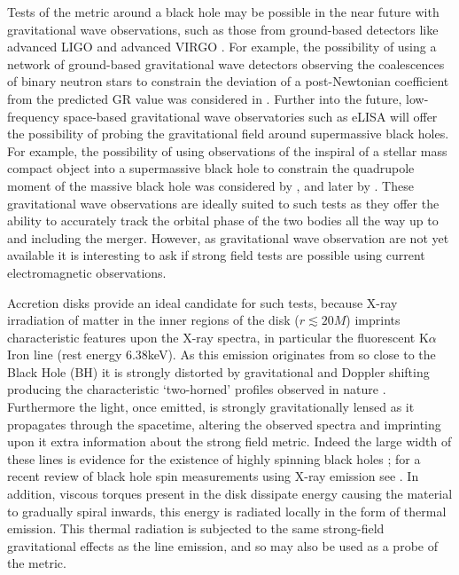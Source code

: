 Tests of the metric around a black hole may be possible in the near future with gravitational wave observations, such as those from ground-based detectors like advanced LIGO and advanced VIRGO \citep{2010CQGra..27h4006H,Acernese2009}. For example, the possibility of using a network of ground-based gravitational wave detectors observing the coalescences of binary neutron stars to constrain the deviation of a post-Newtonian coefficient from the predicted GR value was considered in \cite{2014PhRvD..89h2001A}. Further into the future, low-frequency space-based gravitational wave observatories such as eLISA \citep{TheGravitationalUniverse} will offer the possibility of probing the gravitational field around supermassive black holes. For example, the possibility of using observations of the inspiral of a stellar mass compact object into a supermassive black hole to constrain the quadrupole moment of the massive black hole was considered by \cite{1997PhRvD..56.1845R}, and later by \cite{2007PhRvD..75d2003B}. These gravitational wave observations are ideally suited to such tests as they offer the ability to accurately track the orbital phase of the two bodies all the way up to and including the merger. However, as gravitational wave observation are not yet available it is interesting to ask if strong field tests are possible using current electromagnetic observations.  

Accretion disks provide an ideal candidate for such tests, because X-ray irradiation of matter in the inner regions of the disk ($r \lesssim 20M$) imprints characteristic features upon the X-ray spectra, in particular the fluorescent K$\alpha$ Iron line (rest energy 6.38keV). As this emission originates from so close to the Black Hole (BH)  it is strongly distorted by gravitational and Doppler shifting producing the characteristic `two-horned' profiles observed in nature \cite{1995Natur.375..659T}. Furthermore the light, once emitted, is strongly gravitationally lensed as it propagates through the spacetime, altering the observed spectra and imprinting upon it extra information about the strong field metric. Indeed the large width of these lines is evidence for the existence of highly spinning black holes \citep{1996MNRAS.279..837I}; for a recent review of black hole spin measurements using X-ray emission see \cite{2011CQGra..28k4009M}. In addition, viscous torques present in the disk dissipate energy causing the material to gradually spiral inwards, this energy is radiated locally in the form of thermal emission. This thermal radiation is subjected to the same strong-field gravitational effects as the line emission, and so may also be used as a probe of the metric. 

